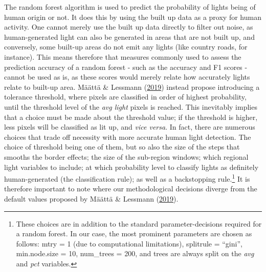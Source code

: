 \documentclass[11pt,preprint, authoryear]{elsarticle}
\numberwithin{equation}{section}
\numberwithin{figure}{section}
\numberwithin{table}{section}
\let\rmarkdownfootnote\footnote%
\def\footnote{\protect\rmarkdownfootnote}
\begin{document}
The random forest algorithm is used to predict the probability of lights
being of human origin or not. It does this by using the built up data as
a proxy for human activity. One cannot merely use the built up data
directly to filter out noise, as human-generated light can also be
generated in areas that are not built up, and conversely, some built-up
areas do not emit any lights (like country roads, for instance). This
means therefore that measures commonly used to assess the prediction
accuracy of a random forest - such as the accuracy and F1 scores -
cannot be used as is, as these scores would merely relate how accurately
lights relate to built-up area. Määttä \& Lessmann
(\protect\hyperlink{ref-maatta}{2019}) instead propose introducing a
tolerance threshold, where pixels are classified in order of highest
probability, until the threshold level of the \emph{avg light} pixels is
reached. This inevitably implies that a choice must be made about the
threshold value; if the threshold is higher, less pixels will be
classified as lit up, and \emph{vice versa}. In fact, there are numerous
choices that trade off necessity with more accurate human light
detection. The choice of threshold being one of them, but so also the
size of the steps that smooths the border effects; the size of the
sub-region windows; which regional light variables to include; at which
probability level to classify lights as definitely human-generated (the
classification rule); as well as a backstopping rule.\footnote{These
  choices are in addition to the standard parameter-decisions required
  for a random forest. In our case, the most prominent parameters are
  chosen as follows: mtry = 1 (due to computational limitations),
  splitrule = ``gini'', min.node.size = 10, num\_trees = 200, and trees
  are always split on the \emph{avg} and \emph{pct} variables.} It is
therefore important to note where our methodological decisions diverge
from the default values proposed by Määttä \& Lessmann
(\protect\hyperlink{ref-maatta}{2019}).
\end{document}

